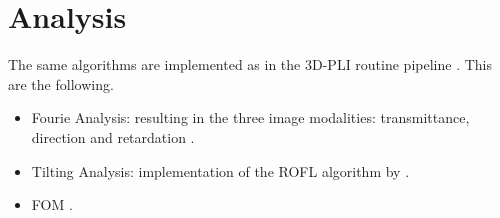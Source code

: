 \section{Analysis}
% 
The same algorithms are implemented as in the \ac{3D-PLI} routine pipeline \dummy[-> theory]{}.
This are the following.
% 
\begin{itemize}
  \item Fourie Analysis: resulting in the three image modalities: transmittance, direction and retardation \dummy{}. 
  \item Tilting Analysis: implementation of the \ac{ROFL} algorithm by \cite{Schmitz2018} \dummy{}. 
  \item \ac{FOM} \dummy{}. 
\end{itemize}
% 
% 
